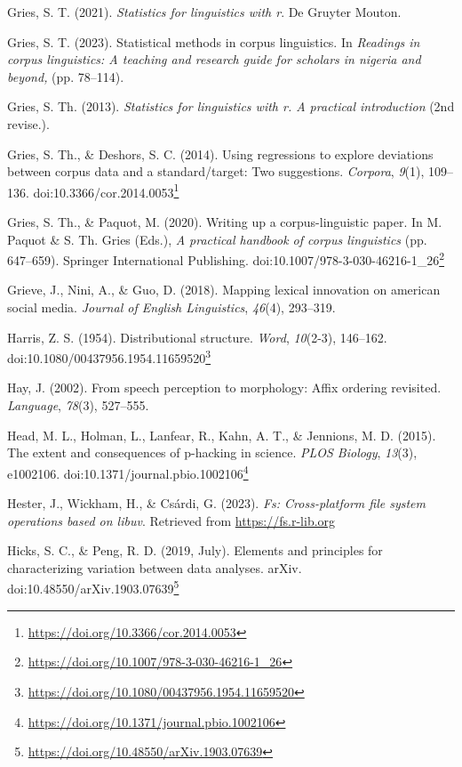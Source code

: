 \documentclass[
  letterpaper,
]{latex/krantz}
\newlength{\cslhangindent}
\newenvironment{CSLReferences}[2] %
 {\begin{list}{}{%
  \setlength{\itemindent}{0pt}
  \setlength{\leftmargin}{0pt}
  \setlength{\parsep}{0pt}
  \ifodd #1
   \setlength{\leftmargin}{\cslhangindent}
   \setlength{\itemindent}{-1\cslhangindent}
  \fi
  \setlength{\itemsep}{#2\baselineskip}}}
 {\end{list}}
\theoremstyle{definition}
\theoremstyle{remark}
\DeclareRobustCommand{\href}[2]{#2\footnote{\url{#1}}}
\begin{document}
\begin{CSLReferences}{1}{0}
Gries, S. T. (2021). \emph{Statistics for linguistics with r}. De
Gruyter Mouton.

Gries, S. T. (2023). Statistical methods in corpus linguistics. In
\emph{Readings in corpus linguistics: A teaching and research guide for
scholars in nigeria and beyond,} (pp. 78--114).

Gries, S. Th. (2013). \emph{Statistics for linguistics with r. A
practical introduction} (2nd revise.).

Gries, S. Th., \& Deshors, S. C. (2014). Using regressions to explore
deviations between corpus data and a standard/target: Two suggestions.
\emph{Corpora}, \emph{9}(1), 109--136.
doi:\href{https://doi.org/10.3366/cor.2014.0053}{10.3366/cor.2014.0053}

Gries, S. Th., \& Paquot, M. (2020). Writing up a corpus-linguistic
paper. In M. Paquot \& S. Th. Gries (Eds.), \emph{A practical handbook
of corpus linguistics} (pp. 647--659). Springer International
Publishing.
doi:\href{https://doi.org/10.1007/978-3-030-46216-1_26}{10.1007/978-3-030-46216-1\_26}

Grieve, J., Nini, A., \& Guo, D. (2018). Mapping lexical innovation on
american social media. \emph{Journal of English Linguistics},
\emph{46}(4), 293--319.

Harris, Z. S. (1954). Distributional structure. \emph{Word},
\emph{10}(2-3), 146--162.
doi:\href{https://doi.org/10.1080/00437956.1954.11659520}{10.1080/00437956.1954.11659520}

Hay, J. (2002). From speech perception to morphology: Affix ordering
revisited. \emph{Language}, \emph{78}(3), 527--555.

Head, M. L., Holman, L., Lanfear, R., Kahn, A. T., \& Jennions, M. D.
(2015). The extent and consequences of p-hacking in science. \emph{PLOS
Biology}, \emph{13}(3), e1002106.
doi:\href{https://doi.org/10.1371/journal.pbio.1002106}{10.1371/journal.pbio.1002106}

Hester, J., Wickham, H., \& Csárdi, G. (2023). \emph{Fs: Cross-platform
file system operations based on libuv}. Retrieved from
\url{https://fs.r-lib.org}

Hicks, S. C., \& Peng, R. D. (2019, July). Elements and principles for
characterizing variation between data analyses. arXiv.
doi:\href{https://doi.org/10.48550/arXiv.1903.07639}{10.48550/arXiv.1903.07639}


\end{CSLReferences}
\end{document}

